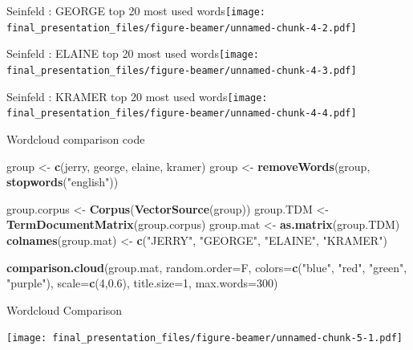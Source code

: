 \documentclass[
  ignorenonframetext,
]{beamer}
\newenvironment{Shaded}{\begin{snugshade}}{\end{snugshade}}
\newcommand{\DataTypeTok}[1]{\textcolor[rgb]{0.13,0.29,0.53}{#1}}
\newcommand{\DecValTok}[1]{\textcolor[rgb]{0.00,0.00,0.81}{#1}}
\newcommand{\FloatTok}[1]{\textcolor[rgb]{0.00,0.00,0.81}{#1}}
\newcommand{\KeywordTok}[1]{\textcolor[rgb]{0.13,0.29,0.53}{\textbf{#1}}}
\newcommand{\NormalTok}[1]{#1}
\newcommand{\StringTok}[1]{\textcolor[rgb]{0.31,0.60,0.02}{#1}}
\begin{document}
\begin{frame}{Seinfeld : GEORGE top 20 most used
words\texttt{[image: final\_presentation\_files/figure-beamer/unnamed-chunk-4-2.pdf]}}
\protect\hypertarget{seinfeld-george-top-20-most-used-words}{}

\end{frame}

\begin{frame}{Seinfeld : ELAINE top 20 most used
words\texttt{[image: final\_presentation\_files/figure-beamer/unnamed-chunk-4-3.pdf]}}
\protect\hypertarget{seinfeld-elaine-top-20-most-used-words}{}

\end{frame}

\begin{frame}{Seinfeld : KRAMER top 20 most used
words\texttt{[image: final\_presentation\_files/figure-beamer/unnamed-chunk-4-4.pdf]}}
\protect\hypertarget{seinfeld-kramer-top-20-most-used-words}{}

\end{frame}

\begin{frame}[fragile]{Wordcloud comparison code}
\protect\hypertarget{wordcloud-comparison-code}{}

\begin{Shaded}
\begin{Highlighting}[]
\NormalTok{group <-}\StringTok{ }\KeywordTok{c}\NormalTok{(jerry, george, elaine, kramer)}
\NormalTok{group <-}\StringTok{ }\KeywordTok{removeWords}\NormalTok{(group, }\KeywordTok{stopwords}\NormalTok{(}\StringTok{"english"}\NormalTok{))}

\NormalTok{group.corpus <-}\StringTok{ }\KeywordTok{Corpus}\NormalTok{(}\KeywordTok{VectorSource}\NormalTok{(group))}
\NormalTok{group.TDM <-}\StringTok{ }\KeywordTok{TermDocumentMatrix}\NormalTok{(group.corpus)}
\NormalTok{group.mat <-}\StringTok{ }\KeywordTok{as.matrix}\NormalTok{(group.TDM)}
\KeywordTok{colnames}\NormalTok{(group.mat) <-}\StringTok{ }\KeywordTok{c}\NormalTok{(}\StringTok{"JERRY"}\NormalTok{, }\StringTok{"GEORGE"}\NormalTok{, }\StringTok{"ELAINE"}\NormalTok{, }\StringTok{"KRAMER"}\NormalTok{)}

\KeywordTok{comparison.cloud}\NormalTok{(group.mat, }\DataTypeTok{random.order=}\NormalTok{F, }\DataTypeTok{colors=}\KeywordTok{c}\NormalTok{(}\StringTok{"blue"}\NormalTok{, }\StringTok{"red"}\NormalTok{, }\StringTok{"green"}\NormalTok{, }\StringTok{"purple"}\NormalTok{), }\DataTypeTok{scale=}\KeywordTok{c}\NormalTok{(}\DecValTok{4}\NormalTok{,}\FloatTok{0.6}\NormalTok{), }\DataTypeTok{title.size=}\DecValTok{1}\NormalTok{, }\DataTypeTok{max.words=}\DecValTok{300}\NormalTok{)}
\end{Highlighting}
\end{Shaded}

\end{frame}

\begin{frame}{Wordcloud Comparison}
\protect\hypertarget{wordcloud-comparison}{}

\texttt{[image: final\_presentation\_files/figure-beamer/unnamed-chunk-5-1.pdf]}

\end{frame}
\end{document}
